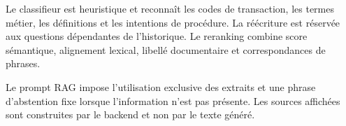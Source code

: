 Le classifieur est heuristique et reconnaît les codes de transaction, les termes métier, les définitions et les intentions de procédure. La réécriture est réservée aux questions dépendantes de l'historique. Le reranking combine score sémantique, alignement lexical, libellé documentaire et correspondances de phrases.

Le prompt RAG impose l'utilisation exclusive des extraits et une phrase d'abstention fixe lorsque l'information n'est pas présente. Les sources affichées sont construites par le backend et non par le texte généré.